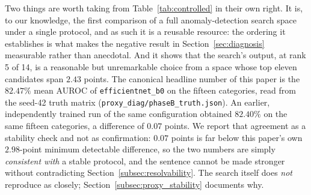 Two things are worth taking from Table~\ref{tab:controlled} in their own right.
It is, to our knowledge, the first comparison of a full anomaly-detection search
space under a single protocol, and as such it is a reusable resource: the ordering
it establishes is what makes the negative result in Section~\ref{sec:diagnosis}
measurable rather than anecdotal. And it shows that the search's output, at rank 5
of 14, is a reasonable but unremarkable choice from a space whose top eleven
candidates span $2.43$ points. The canonical headline number of this paper is the
$82.47\%$ mean AUROC of \texttt{efficientnet\_b0} on the fifteen categories, read
from the seed-42 truth matrix
(\texttt{proxy\_diag/phaseB\_truth.json}). An earlier, independently trained run of
the same configuration obtained $82.40\%$ on the same fifteen categories, a
difference of $0.07$ points. We report that agreement as a stability check and not
as confirmation: $0.07$ points is far below this paper's own $2.98$-point minimum
detectable difference, so the two numbers are simply \emph{consistent with} a
stable protocol, and the sentence cannot be made stronger without contradicting
Section~\ref{subsec:resolvability}. The search itself does \emph{not} reproduce as
closely;
Section~\ref{subsec:proxy_stability} documents why.
